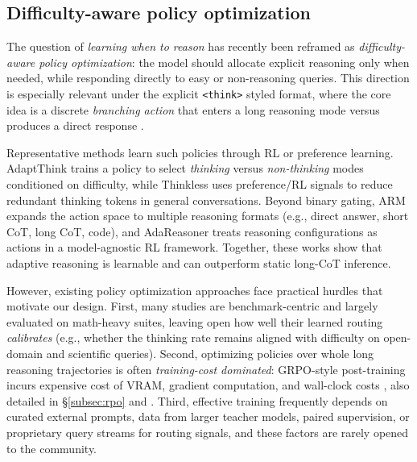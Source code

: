 \subsection{Difficulty-aware policy optimization}
The question of \textit{learning when to reason} has recently been reframed as \emph{difficulty-aware policy optimization}: the model should allocate explicit reasoning only when needed, while responding directly to easy or non-reasoning queries. This direction is especially relevant under the explicit \texttt{<think>} styled format, where the core idea is a discrete \emph{branching action} that enters a long reasoning mode versus produces a direct response \cite{Zhang2025AdaptThink, Bao2025Thinkless, wu2025arm, wang2025adareasoner}.

Representative methods learn such policies through RL or preference learning. AdaptThink \cite{Zhang2025AdaptThink} trains a policy to select \emph{thinking} versus \emph{non-thinking} modes conditioned on difficulty, while Thinkless \cite{Bao2025Thinkless} uses preference/RL signals to reduce redundant thinking tokens in general conversations. Beyond binary gating, ARM \cite{wu2025arm} expands the action space to multiple reasoning formats (e.g., direct answer, short CoT, long CoT, code), and AdaReasoner \cite{wang2025adareasoner} treats reasoning configurations as actions in a model-agnostic RL framework. Together, these works show that adaptive reasoning is learnable and can outperform static long-CoT inference.

However, existing policy optimization approaches face practical hurdles that motivate our design. 
First, many studies are benchmark-centric and largely evaluated on math-heavy suites, leaving open how well their learned routing \emph{calibrates} (e.g., whether the thinking rate remains aligned with difficulty on open-domain and scientific queries). 
Second, optimizing policies over whole long reasoning trajectories is often \emph{training-cost dominated}: GRPO-style post-training incurs expensive cost of VRAM, gradient computation, and  wall-clock costs \cite{guo2025deepseek}, also detailed in \S\ref{subsec:rpo} and . 
Third, effective training frequently depends on curated external prompts, data from larger teacher models, paired supervision, or proprietary query streams for routing signals, and these factors are rarely opened to the community. 

